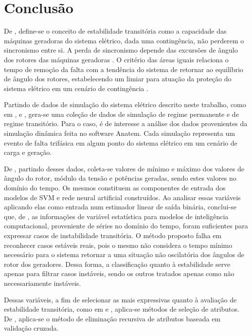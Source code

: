 \documentclass[12pt,oneside,a4paper,chapter=TITLE,section=TITLE,sumario=tradicional,english,brazil]{abntex2}
\begin{document}
\chapter{Conclusão}
De \textcite{kundur1994}, define-se o conceito de estabilidade transitória como a capacidade das máquinas geradoras  do sistema elétrico, dada uma contingência, não perderem o sincronismo entre si. A perda de sincronismo depende das excursões de ângulo dos rotores das máquinas geradoras \cite{kundur1994}. O critério das áreas iguais relaciona o tempo de remoção da falta com a tendência do sistema de retornar ao equilíbrio de ângulo dos rotores, estabelecendo um limiar para atuação da proteção do sistema elétrico em um cenário de contingência \cite{kundur1994}.\par 
Partindo de dados de simulação do sistema elétrico descrito neste trabalho, como em \textcite{Edwards1996}, \textcite{kalyani2011} e \textcite{Xu2016}, gera-se uma coleção de dados de simulação de regime permanente e de regime transitório. Para o caso, é de interesse a análise dos dados provenientes da simulação dinâmica feita no software Anatem. Cada simulação representa um evento de falta trifásica em algum ponto do sistema elétrico em um cenário de carga e geração.\par 
De \textcite{haykin2009}, partindo desses dados, coleta-se valores de mínimo e máximo dos valores de ângulo do rotor, módulo da tensão e potências geradas, sendo estes valores no domínio do tempo. Os mesmos constituem as componentes de entrada dos modelos de SVM e rede neural artificial construídos. Ao analisar essas variáveis aplicando elas como entrada num estimador linear de saída binária, conclui-se que, de \textcite{haykin2009}, as informações de variável estatística para modelos de inteligência computacional, proveniente de séries no domínio do tempo, foram suficientes para expressar casos de instabilidade transitória. O método proposto falha em reconhecer casos estáveis reais, pois o mesmo não considera o tempo mínimo necessário para o sistema retornar a uma situação não oscilatória dos ângulos de rotor dos geradores. Dessa forma, a classificação quanto à estabilidade serve apenas para filtrar casos instáveis, sendo os outros tratados apenas como não necessariamente instáveis.\par 
Dessas variáveis, a fim de selecionar as mais expressivas quanto à avaliação de estabilidade transitória, como em \textcite{Edwards1996} e \textcite{kalyani2011}, aplica-se métodos de seleção de atributos. De \textcite{Xu2016}, aplica-se o método de eliminação recursiva de atributos baseada em validação cruzada.\par 
\end{document}

